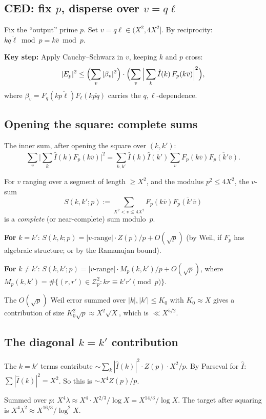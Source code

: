 \subsection{CED: fix $p$, disperse over $v = q\ell$}
Fix the ``output'' prime $p$. Set $v = q\ell \in (X^2, 4X^2]$.
By reciprocity: $k\overline{q\ell} \bmod p = k\overline{v} \bmod p$.

\textbf{Key step:} Apply Cauchy--Schwarz in $v$, keeping $k$ and $p$ cross:
\[
  |E_p|^2 \le \Bigl(\sum_v |\beta_v|^2\Bigr)
  \cdot \Bigl(\sum_v \Big|\sum_{k} \hat{I}(k) \, F_p(k\overline{v}) \Big|^2\Bigr),
\]
where $\beta_v = F_q(k\overline{p\ell}) F_\ell(k\overline{pq})$ carries the
$q,\ell$-dependence.

\subsection{Opening the square: complete sums}
The inner sum, after opening the square over $(k, k')$:
\[
  \sum_v \Big|\sum_k \hat{I}(k) F_p(k\overline{v})\Big|^2
  = \sum_{k,k'} \hat{I}(k) \overline{\hat{I}(k')}
  \sum_v F_p(k\overline{v}) \overline{F_p(k'\overline{v})}.
\]

For $v$ ranging over a segment of length $\ge X^2$, and
the modulus $p^2 \le 4X^2$, the $v$-sum
\[
  S(k,k';p) := \sum_{X^2 < v \le 4X^2} F_p(k\overline{v}) \overline{F_p(k'\overline{v})}
\]
is a \emph{complete} (or near-complete) sum modulo~$p$.

\textbf{For} $k = k'$: $S(k,k;p) = |v\text{-range}| \cdot Z(p)/p + O(\sqrt{p})$
(by Weil, if $F_p$ has algebraic structure; or by the Ramanujan bound).

\textbf{For} $k \ne k'$: $S(k,k';p) = |v\text{-range}| \cdot M_p(k,k')/p + O(\sqrt{p})$,
where $M_p(k,k') = \#\{(r,r') \in \mathcal{Z}_p^2 : kr \equiv k'r' \pmod{p}\}$.

The $O(\sqrt{p})$ Weil error summed over $|k|, |k'| \le K_0$ with
$K_0 \approx X$ gives a contribution of size $K_0^2 \sqrt{p} \approx X^2 \sqrt{X}$,
which is $\ll X^{5/2}$.

\subsection{The diagonal $k = k'$ contribution}
The $k = k'$ terms contribute $\sim \sum_k |\hat{I}(k)|^2 \cdot Z(p) \cdot X^2/p$.
By Parseval for $\hat{I}$: $\sum |\hat{I}(k)|^2 = X^2$.
So this is $\sim X^4 Z(p) / p$.

Summed over $p$: $X^4 \lambda \approx X^4 \cdot X^{2/3}/\log X = X^{14/3}/\log X$.
The target after squaring is $X^4 \lambda^2 \approx X^{16/3}/\log^2 X$.

